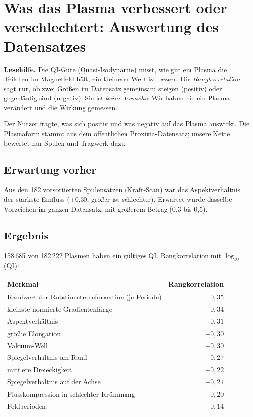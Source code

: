 \section{Was das Plasma verbessert oder verschlechtert: Auswertung des Datensatzes}\label{sec:qi_einfluss}

\textbf{Lesehilfe.} Die QI-Güte (Quasi-Isodynamie) misst, wie gut ein Plasma die Teilchen im Magnetfeld hält; ein
kleinerer Wert ist besser. Die \emph{Rangkorrelation} sagt nur, ob zwei Größen im Datensatz gemeinsam steigen
(positiv) oder gegenläufig sind (negativ). Sie ist \emph{keine Ursache}: Wir haben nie ein Plasma verändert und die Wirkung gemessen.

Der Nutzer fragte, was sich positiv und was negativ auf das Plasma auswirkt. Die Plasmaform stammt aus dem öffentlichen
Proxima-Datensatz; unsere Kette bewertet nur Spulen und Tragwerk dazu.

\subsection*{Erwartung vorher}
Aus den 182 vorsortierten Spulensätzen (Kraft-Scan) war das Aspektverhältnis der stärkste Einfluss (+0,30, größer ist
schlechter). Erwartet wurde dasselbe Vorzeichen im ganzen Datensatz, mit größerem Betrag (0,3 bis 0,5).

\subsection*{Ergebnis}
158\,685 von 182\,222 Plasmen haben ein gültiges QI. Rangkorrelation mit $\log_{10}$(QI):

\begin{tabular}{lr}
\hline
Merkmal & Rangkorrelation \\ \hline
Randwert der Rotationstransformation (je Periode) & $+0{,}35$ \\
kleinste normierte Gradientenlänge & $-0{,}34$ \\
Aspektverhältnis & $-0{,}31$ \\
größte Elongation & $-0{,}30$ \\
Vakuum-Well & $-0{,}30$ \\
Spiegelverhältnis am Rand & $+0{,}27$ \\
mittlere Dreieckigkeit & $+0{,}22$ \\
Spiegelverhältnis auf der Achse & $-0{,}21$ \\
Flusskompression in schlechter Krümmung & $-0{,}20$ \\
Feldperioden & $+0{,}14$ \\ \hline
\end{tabular}

